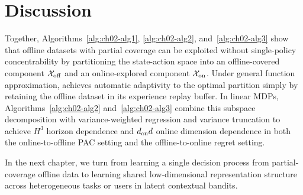 \section{Discussion}
\label{sec:ch02-lin-discussion}

Together, Algorithms~\ref{alg:ch02-alg1}, \ref{alg:ch02-alg2}, and~\ref{alg:ch02-alg3} show that offline datasets with partial coverage can be exploited without single-policy concentrability by partitioning the state-action space into an offline-covered component ${\mathcal{X}}_{{\operatorname{off}}}$ and an online-explored component ${\mathcal{X}}_{{\operatorname{on}}}$. Under general function approximation,  achieves automatic adaptivity to the optimal partition simply by retaining the offline dataset in its experience replay buffer. In linear MDPs, Algorithms~\ref{alg:ch02-alg2} and~\ref{alg:ch02-alg3} combine this subspace decomposition with variance-weighted regression and variance truncation to achieve $H^3$ horizon dependence and $d_{{\operatorname{on}}} d$ online dimension dependence in both the online-to-offline PAC setting and the offline-to-online regret setting.

In the next chapter, we turn from learning a single decision process from partial-coverage offline data to learning shared low-dimensional representation structure across heterogeneous tasks or users in latent contextual bandits.
